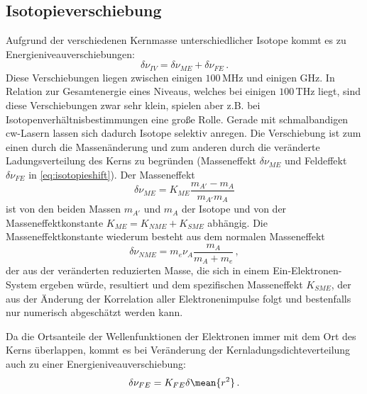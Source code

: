 
\subsection{Isotopieverschiebung}\label{subsec:isotopieverschiebung}
Aufgrund der verschiedenen Kernmasse unterschiedlicher Isotope kommt es zu
Energieniveauverschiebungen:
\begin{equation}\label{eq:isotopieshift}
	\delta\nu_{IV}=\delta\nu_{ME}+\delta\nu_{FE}\,.
\end{equation}
Diese Verschiebungen liegen zwischen einigen $100\,$MHz und einigen GHz. In
Relation zur Gesamtenergie eines Niveaus, welches bei einigen $100\,$THz liegt,
sind diese Verschiebungen zwar sehr klein, spielen aber z.B. bei
Isotopenverhältnisbestimmungen eine große Rolle. Gerade mit schmalbandigen
cw-Lasern lassen sich dadurch Isotope selektiv anregen. Die Verschiebung ist zum
einen durch die Massenänderung und zum anderen durch die veränderte Ladungsverteilung des Kerns zu begründen (Masseneffekt $\delta\nu_{ME}$ und Feldeffekt $\delta\nu_{FE}$ in \eqref{eq:isotopieshift}). Der Masseneffekt
\begin{equation}\label{eq:masseneffekt}
	\delta\nu_{ME}=K_{ME}\frac{m_{A'}-m_A}{m_{A'}m_A}
\end{equation}
ist von den beiden Massen $m_{A'}$ und $m_A$ der Isotope und von der
Masseneffektkonstante $K_{ME}=K_{NME}+K_{SME}$ abhängig. Die
Masseneffektkonstante wiederum besteht aus dem normalen Masseneffekt
\begin{equation}\label{eq:normaler_masseneffekt}
	\delta\nu_{NME}=m_e\nu_A\frac{m_A}{m_A+m_e}\,,
\end{equation}
der aus der veränderten reduzierten Masse, die sich in einem
Ein-Elektronen-System ergeben würde, resultiert und dem spezifischen
Masseneffekt $K_{SME}$, der aus der Änderung der Korrelation aller
Elektronenimpulse folgt und bestenfalls nur numerisch abgeschätzt werden
kann. \par Da die Ortsanteile der Wellenfunktionen der Elektronen immer mit dem Ort des
Kerns überlappen, kommt es bei Veränderung der Kernladungsdichteverteilung auch
zu einer Energieniveauverschiebung:
\begin{equation}\label{eq:feldeffekt}
	\delta\nu_{FE}=K_{FE}\delta\mean{r^2}\,.
\end{equation}
